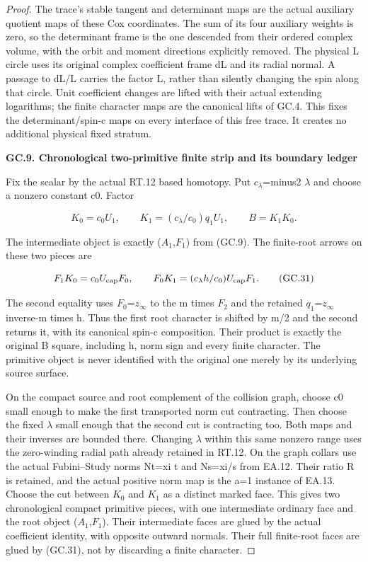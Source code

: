 \begin{proof}
The trace's stable tangent and determinant maps are the actual
auxiliary quotient maps of these Cox coordinates. The sum of its
four auxiliary weights is zero, so the determinant frame is the
one descended from their ordered complex volume, with the orbit
and moment directions explicitly removed. The physical L circle
uses its original complex coefficient frame dL and its radial
normal. A passage to dL/L carries the factor L, rather than
silently changing the spin along that circle. Unit coefficient
changes are lifted with their actual extending logarithms; the
finite character maps are the canonical lifts of GC.4. This fixes
the determinant/spin-c maps on every interface of this free trace.
It creates no additional physical fixed stratum.

\par

\medskip\noindent\textbf{GC.9. Chronological two-primitive finite strip and its boundary ledger}

\par\nobreak

Fix the scalar by the actual RT.12 based homotopy. Put
\(c_{\lambda}\)=minus2 \(\lambda\) and choose a nonzero constant c0. Factor

\[
 K_0=c_0U_1,\qquad K_1=(c_\lambda/c_0)q_1U_1,
                              \qquad B=K_1K_0.
 \tag{GC.30}
\]

The intermediate object is exactly (\(A_1\),\(F_1\)) from (GC.9). The
finite-root arrows on these two pieces are

\[
 F_1K_0=c_0U_{\rm cap}F_0,\qquad
 F_0K_1=(c_\lambda h/c_0)U_{\rm cap}F_1.
 \tag{GC.31}
\]

The second equality uses \(F_0\)=\(z_{\infty}\) to the m times \(F_2\) and the
retained \(q_1\)=\(z_{\infty}\) inverse-m times h. Thus the first root
character is shifted by m/2 and the second returns it, with its
canonical spin-c composition. Their product is exactly the
original B square, including h, norm sign and every finite
character. The primitive object is never identified with the
original one merely by its underlying source surface.

On the compact source and root complement of the collision graph,
choose c0 small enough to make the first transported norm cut
contracting. Then choose the fixed \(\lambda\) small enough that the
second cut is contracting too. Both maps and their inverses are
bounded there. Changing \(\lambda\) within this same nonzero range
uses the zero-winding radial path already retained in RT.12.
On the graph collars use the actual Fubini--Study norms
Nt=\textbar xi\textbar{} \textbar\textbar t\textbar\textbar{} and Ns=\textbar xi\textbar/\textbar\textbar s\textbar\textbar{} from EA.12. Their ratio R is
retained, and the actual positive norm map is the a=1 instance
of EA.13. Choose the cut between \(K_0\) and \(K_1\) as a distinct marked
face. This gives two chronological compact primitive pieces,
with one intermediate ordinary face and the root object (\(A_1\),\(F_1\)).
Their intermediate faces are glued by the actual coefficient
identity, with opposite outward normals. Their full finite-root
faces are glued by (GC.31), not by discarding a finite character.


\end{proof}
